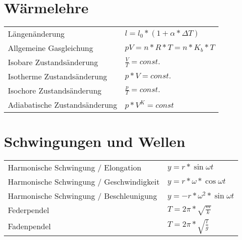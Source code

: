 \documentclass[11pt,a4paper]{paper}
\begin{document}
\section{Wärmelehre}
\begin{tabularx}{\textwidth}{X|X}
	Längenänderung & $l = l_0 * (1 + \alpha * \Delta T)$\\
	Allgemeine Gasgleichung & $pV = n*R*T = n *K_b * T$\\
	Isobare Zustandsänderung & $\frac{V}{T} = const.$\\
	Isotherme Zustandsänderung & $p*V = const.$\\
	Isochore Zustandsänderung & $\frac{p}{T} = const.$\\
	Adiabatische Zustandsänderung & $p * V^K = const$
\end{tabularx}
\section{Schwingungen und Wellen}
\begin{tabularx}{\textwidth}{X|X}
Harmonische Schwingung / Elongation & $y = r * \sin{\omega t}$\\
Harmonische Schwingung / Geschwindigkeit & $y = r * \omega * \cos{\omega t}$\\
Harmonische Schwingung / Beschleunigung & $y = -r * \omega^2 * \sin{\omega t}$\\
Federpendel & $T = 2\pi * \sqrt{\frac{m}{k}}$\\
Fadenpendel & $T= 2\pi * \sqrt{\frac{l}{g}}$\\

\end{tabularx}
\end{document}
